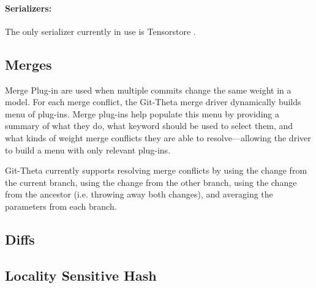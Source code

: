 



\paragraph{Serializers:} The only serializer currently in use is Tensorstore .

\subsection{Merges}

Merge Plug-in are used when multiple commits change the same weight in a model. For each merge conflict, the Git-Theta merge driver dynamically builds menu of plug-ins. Merge plug-ins help populate this menu by providing a summary of what they do, what keyword should be used to select them, and what kinds of weight merge conflicts they are able to resolve---allowing the driver to build a menu with only relevant plug-ins.

Git-Theta currently supports resolving merge conflicts by using the change from the current branch, using the change from the other branch, using the change from the ancestor (i.e. throwing away both changes), and averaging the parameters from each branch.

\subsection{Diffs}


\subsection{Locality Sensitive Hash}
\label{sec:LSH}

